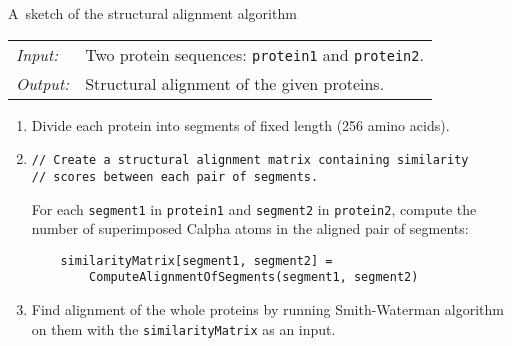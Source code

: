 \begin{algorithm}
\caption{A~sketch of the structural alignment algorithm}

\begin{tabular}{lp{13.39cm}}
{\em Input:} &
Two protein sequences: \texttt{protein1} and \texttt{protein2}.\\
{\em Output:} &
Structural alignment of the given proteins.\\
\end{tabular}

\begin{enumerate}
\item
Divide each protein into segments of fixed length (256 amino acids).

\item 
\begin{verbatim}
// Create a structural alignment matrix containing similarity
// scores between each pair of segments.
\end{verbatim}
For each \texttt{segment1} in \texttt{protein1} and \texttt{segment2} in \texttt{protein2},
compute the number of superimposed Calpha atoms in the aligned pair of segments:
\begin{verbatim}
    similarityMatrix[segment1, segment2] =
        ComputeAlignmentOfSegments(segment1, segment2)
\end{verbatim}

\item
Find alignment of the whole proteins by running Smith-Waterman algorithm on them with the \texttt{similarityMatrix} as an input.

\end{enumerate}
\end{algorithm}

